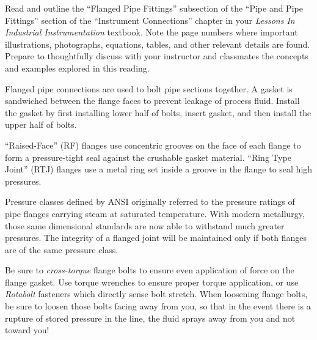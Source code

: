 

Read and outline the ``Flanged Pipe Fittings'' subsection of the ``Pipe and Pipe Fittings'' section of the ``Instrument Connections'' chapter in your {\it Lessons In Industrial Instrumentation} textbook.  Note the page numbers where important illustrations, photographs, equations, tables, and other relevant details are found.  Prepare to thoughtfully discuss with your instructor and classmates the concepts and examples explored in this reading.














Flanged pipe connections are used to bolt pipe sections together.  A gasket is sandwiched between the flange faces to prevent leakage of process fluid.  Install the gasket by first installing lower half of bolts, insert gasket, and then install the upper half of bolts.

\vskip 10pt

``Raised-Face'' (RF) flanges use concentric grooves on the face of each flange to form a pressure-tight seal against the crushable gasket material.  ``Ring Type Joint'' (RTJ) flanges use a metal ring set inside a groove in the flange to seal high pressures.

\vskip 10pt

Pressure classes defined by ANSI originally referred to the pressure ratings of pipe flanges carrying steam at saturated temperature.  With modern metallurgy, those same dimensional standards are now able to withstand much greater pressures.  The integrity of a flanged joint will be maintained only if both flanges are of the same pressure class.

\vskip 10pt

Be sure to {\it cross-torque} flange bolts to ensure even application of force on the flange gasket.  Use torque wrenches to ensure proper torque application, or use {\it Rotabolt} fasteners which directly sense bolt stretch.  When loosening flange bolts, be sure to loosen those bolts facing away from you, so that in the event there is a rupture of stored pressure in the line, the fluid sprays away from you and not toward you!

